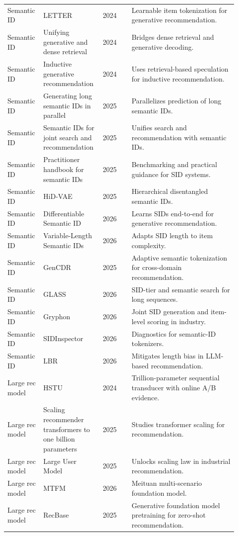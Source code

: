 \documentclass[11pt]{article}
\begin{document}
\begin{longtable}{@{}p{0.13\linewidth}p{0.23\linewidth}p{0.12\linewidth}p{0.44\linewidth}@{}}
Semantic ID & LETTER & 2024 & Learnable item tokenization for generative recommendation.\\
Semantic ID & Unifying generative and dense retrieval & 2024 & Bridges dense retrieval and generative decoding.\\
Semantic ID & Inductive generative recommendation & 2024 & Uses retrieval-based speculation for inductive recommendation.\\
Semantic ID & Generating long semantic IDs in parallel & 2025 & Parallelizes prediction of long semantic IDs.\\
Semantic ID & Semantic IDs for joint search and recommendation & 2025 & Unifies search and recommendation with semantic IDs.\\
Semantic ID & Practitioner handbook for semantic IDs & 2025 & Benchmarking and practical guidance for SID systems.\\
Semantic ID & HiD-VAE & 2025 & Hierarchical disentangled semantic IDs.\\
Semantic ID & Differentiable Semantic ID & 2026 & Learns SIDs end-to-end for generative recommendation.\\
Semantic ID & Variable-Length Semantic IDs & 2026 & Adapts SID length to item complexity.\\
Semantic ID & GenCDR & 2025 & Adaptive semantic tokenization for cross-domain recommendation.\\
Semantic ID & GLASS & 2026 & SID-tier and semantic search for long sequences.\\
Semantic ID & Gryphon & 2026 & Joint SID generation and item-level scoring in industry.\\
Semantic ID & SIDInspector & 2026 & Diagnostics for semantic-ID tokenizers.\\
Semantic ID & LBR & 2026 & Mitigates length bias in LLM-based recommendation.\\
Large rec model & HSTU & 2024 & Trillion-parameter sequential transducer with online A/B evidence.\\
Large rec model & Scaling recommender transformers to one billion parameters & 2025 & Studies transformer scaling for recommendation.\\
Large rec model & Large User Model & 2025 & Unlocks scaling law in industrial recommendation.\\
Large rec model & MTFM & 2026 & Meituan multi-scenario foundation model.\\
Large rec model & RecBase & 2025 & Generative foundation model pretraining for zero-shot recommendation.\\

\end{longtable}
\end{document}
